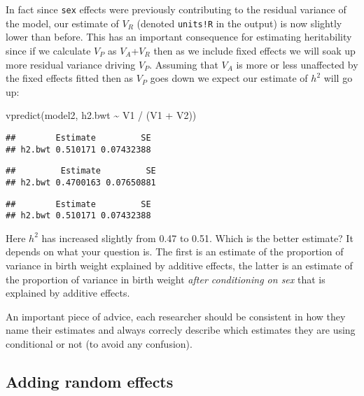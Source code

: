 \documentclass[
  12pt,
]{book}
\newenvironment{Shaded}{\begin{snugshade}}{\end{snugshade}}
\newcommand{\FunctionTok}[1]{\textcolor[rgb]{0.00,0.00,0.00}{#1}}
\newcommand{\NormalTok}[1]{#1}
\newcommand{\SpecialCharTok}[1]{\textcolor[rgb]{0.00,0.00,0.00}{#1}}
\begin{document}
In fact since \texttt{sex} effects were previously contributing to the residual variance of the model, our estimate of \(V_R\) (denoted \texttt{units!R} in the output) is now slightly lower than before. This has an important consequence for estimating heritability since if we calculate \(V_P\) as \(V_A\)+\(V_R\) then as we include fixed effects we will soak up more residual variance driving \(V_P\). Assuming that \(V_A\) is more or less unaffected by the fixed effects fitted then as \(V_P\) goes down we expect our estimate of \(h^2\) will go up:

\begin{Shaded}
\begin{Highlighting}[]
\FunctionTok{vpredict}\NormalTok{(model2, h2.bwt }\SpecialCharTok{\textasciitilde{}}\NormalTok{ V1 }\SpecialCharTok{/}\NormalTok{ (V1 }\SpecialCharTok{+}\NormalTok{ V2))}
\end{Highlighting}
\end{Shaded}

\begin{verbatim}
##        Estimate         SE
## h2.bwt 0.510171 0.07432388
\end{verbatim}

\begin{verbatim}
##         Estimate         SE
## h2.bwt 0.4700163 0.07650881
\end{verbatim}

\begin{verbatim}
##        Estimate         SE
## h2.bwt 0.510171 0.07432388
\end{verbatim}

Here \(h^2\) has increased slightly from 0.47 to 0.51. Which is the better estimate? It depends on what your question is. The first is an estimate of the proportion of variance in birth weight explained by additive effects, the latter is an estimate of the proportion of variance in birth weight \emph{after conditioning on sex} that is explained by additive effects.

An important piece of advice, each researcher should be consistent in how they name their estimates and always correcly describe which estimates they are using conditional or not (to avoid any confusion).

\hypertarget{adding-random-effects}{%
\subsection{Adding random effects}\label{adding-random-effects}}
\end{document}
